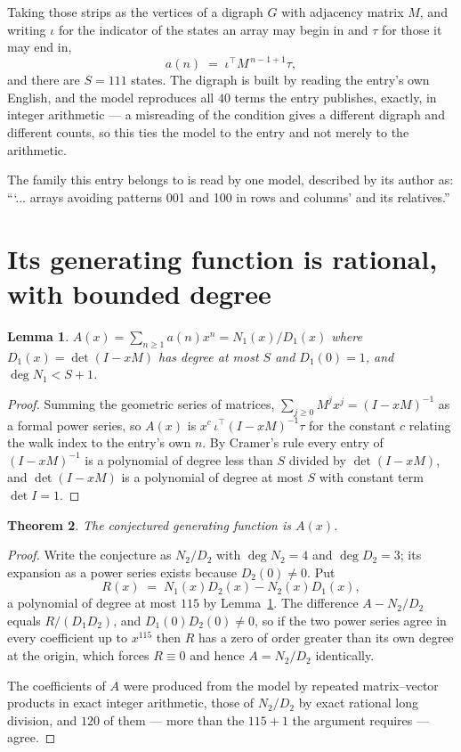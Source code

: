 \documentclass[11pt,a4paper]{article}
\theoremstyle{plain}
\newtheorem{theorem}{Theorem}
\newtheorem{lemma}[theorem]{Lemma}
\theoremstyle{definition}
\begin{document}
Taking those strips as the vertices of a digraph $G$ with adjacency matrix $M$, and writing
$\iota$ for the indicator of the states an array may begin in and $\tau$ for those it may end
in,
\[
a(n)\;=\;\iota^{\!\top}M^{\,n-1+1}\tau ,
\]
and there are $S=111$ states. The digraph is built by reading the entry's own English, and the
model reproduces all $40$ terms the entry publishes, exactly, in integer arithmetic --- a
misreading of the condition gives a different digraph and different counts, so this ties the
model to the entry and not merely to the arithmetic.

The family this entry belongs to is read by one model, described by its author as: ```... arrays avoiding patterns 001 and 100 in rows and columns' and its relatives.''


\section{Its generating function is rational, with bounded degree}

\begin{lemma}\label{lem:rat}
$A(x)=\sum_{n\ge1}a(n)x^n=N_1(x)/D_1(x)$ where $D_1(x)=\det(I-xM)$ has degree at most
$S$ and $D_1(0)=1$, and $\deg N_1<S+1$.
\end{lemma}

\begin{proof}
Summing the geometric series of matrices, $\sum_{j\ge0}M^jx^j=(I-xM)^{-1}$ as a formal
power series, so $A(x)$ is $x^{c}\,\iota^{\!\top}(I-xM)^{-1}\tau$ for the constant $c$
relating the walk index to the entry's own $n$. By Cramer's rule every entry of
$(I-xM)^{-1}$ is a polynomial of degree less than $S$ divided by $\det(I-xM)$, and
$\det(I-xM)$ is a polynomial of degree at most $S$ with constant term $\det I=1$.
\end{proof}

\begin{theorem}
The conjectured generating function is $A(x)$.
\end{theorem}

\begin{proof}
Write the conjecture as $N_2/D_2$ with $\deg N_2=4$ and $\deg D_2=3$; its expansion as a
power series exists because $D_2(0)\neq0$. Put
\[
R(x)\;=\;N_1(x)D_2(x)-N_2(x)D_1(x),
\]
a polynomial of degree at most $115$ by Lemma~\ref{lem:rat}. The difference
$A-N_2/D_2$ equals $R/(D_1D_2)$, and $D_1(0)D_2(0)\neq0$, so if the two power series agree in
every coefficient up to $x^{115}$ then $R$ has a zero of order greater than its own
degree at the origin, which forces $R\equiv0$ and hence $A=N_2/D_2$ identically.

The coefficients of $A$ were produced from the model by repeated matrix--vector products in
exact integer arithmetic, those of $N_2/D_2$ by exact rational long division, and $120$
of them --- more than the $115+1$ the argument requires --- agree.
\end{proof}
\end{document}
